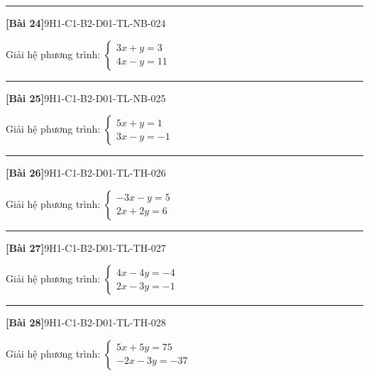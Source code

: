 \documentclass[12pt,a4paper]{article}
\newif\ifloigiai
\newenvironment{cauhoi}[2]{%
  \par\medskip\noindent\rule{\textwidth}{0.4pt}\par\nopagebreak
  \noindent\textbf{[#1]}\hfill{\scriptsize\ttfamily #2}\par\nopagebreak\smallskip}{\par}
\newcommand{\loigiai}[1]{\ifloigiai\par\smallskip\noindent\textit{Lời giải.} #1\par\fi}
\begin{document}
\begin{cauhoi}{Bài 24}{9H1-C1-B2-D01-TL-NB-024}
Giải hệ phương trình: $\begin{cases}3x + y=3\\ 4x - y=11\end{cases}$
\loigiai{Cộng từng vế hai phương trình ta được $7x=14$, suy ra $x=2$. Thay vào phương trình thứ nhất: $3\cdot(2)+y=3$, suy ra $y=-3$. Vậy hệ có nghiệm $(x;y)=(2;-3)$.}
\end{cauhoi}
\begin{cauhoi}{Bài 25}{9H1-C1-B2-D01-TL-NB-025}
Giải hệ phương trình: $\begin{cases}5x + y=1\\ 3x - y=-1\end{cases}$
\loigiai{Cộng từng vế hai phương trình ta được $8x=0$, suy ra $x=0$. Thay vào phương trình thứ nhất: $5\cdot(0)+y=1$, suy ra $y=1$. Vậy hệ có nghiệm $(x;y)=(0;1)$.}
\end{cauhoi}
\begin{cauhoi}{Bài 26}{9H1-C1-B2-D01-TL-TH-026}
Giải hệ phương trình: $\begin{cases}-3x - y=5\\ 2x + 2y=6\end{cases}$
\loigiai{Nhân hai vế của phương trình thứ nhất với $2$ và phương trình thứ hai với $1$ rồi cộng từng vế để khử $y$: $-4x=16$, suy ra $x=-4$. Thay $x=-4$ vào phương trình thứ nhất: $-3\cdot(-4)-y=5$, suy ra $y=7$. Vậy hệ có nghiệm $(x;y)=(-4;7)$.}
\end{cauhoi}
\begin{cauhoi}{Bài 27}{9H1-C1-B2-D01-TL-TH-027}
Giải hệ phương trình: $\begin{cases}4x - 4y=-4\\ 2x - 3y=-1\end{cases}$
\loigiai{Nhân hai vế của phương trình thứ nhất với $-3$ và phương trình thứ hai với $4$ rồi cộng từng vế để khử $y$: $-4x=8$, suy ra $x=-2$. Thay $x=-2$ vào phương trình thứ nhất: $4\cdot(-2)-4y=-4$, suy ra $y=-1$. Vậy hệ có nghiệm $(x;y)=(-2;-1)$.}
\end{cauhoi}
\begin{cauhoi}{Bài 28}{9H1-C1-B2-D01-TL-TH-028}
Giải hệ phương trình: $\begin{cases}5x + 5y=75\\ -2x - 3y=-37\end{cases}$
\loigiai{Nhân hai vế của phương trình thứ nhất với $-3$ và phương trình thứ hai với $-5$ rồi cộng từng vế để khử $y$: $-5x=-40$, suy ra $x=8$. Thay $x=8$ vào phương trình thứ nhất: $5\cdot(8)+5y=75$, suy ra $y=7$. Vậy hệ có nghiệm $(x;y)=(8;7)$.}
\end{cauhoi}
\end{document}
